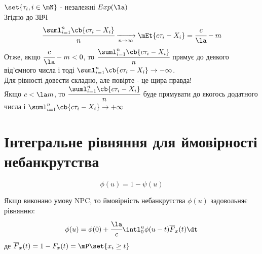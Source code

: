 $\set{\tau_i,i\in\mN}$ - незалежні $Exp(\la)$\\
Згідно до ЗВЧ 
\begin{equation}
	\cfrac{\suml_{i=1}^n \cb{c\tau_i-X_i}}{n} \xrightarrow[n\to\infty]{}\mEt{c\tau_i - X_i} = \cfrac c\la - m
\end{equation}
Отже, якщо $\cfrac c\la - m<0$, то $\cfrac{\suml_{i=1}^n \cb{c\tau_i-X_i}}{n}$ прямує до деякого від’ємного числа і тоді $\suml_{i=1}^n \cb{c\tau_i-X_i}\to-\infty$.\\
Для рівності довести складно, але повірте - це щира правда!\\
Якщо $c<\la m$, то $\cfrac{\suml_{i=1}^n \cb{c\tau_i-X_i}}{n}$ буде прямувати до якогось додатного числа і $\suml_{i=1}^n \cb{c\tau_i-X_i}\to+\infty$
\section{Інтегральне рівняння для ймовірності небанкрутства}
\begin{equation}
	\phi (u) = 1 - \psi (u)
\end{equation}
\begin{teor}
Якщо виконано умову NPC, то ймовірність небанкрутства $\phi(u)$ задовольняє рівнянню:
\begin{equation}
	\phi(u) = \phi(0) + \cfrac\la c \intl_0^u \phi(u-t) \overline{F}_x(t)\dt
\end{equation}
де $\overline{F}_x (t)= 1 - F_x(t) = \mP\set{x_i\geq t}$
\end{teor}
